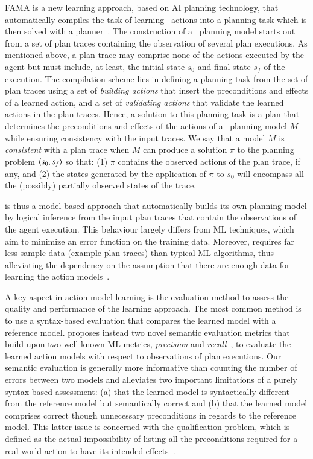 FAMA is a new learning approach, based on AI planning technology, that automatically compiles the task of learning \strips\ actions into a planning task which is then solved with a planner~\cite{aineto2018learning}. The construction of a \strips\ planning model starts out from a set of plan traces containing the observation of several plan executions. As mentioned above, a plan trace may comprise none of the actions executed by the agent but must include, at least, the initial state $s_0$ and final state $s_f$ of the execution. The compilation scheme lies in defining a planning task from the set of plan traces using a set of \emph{building actions} that insert the preconditions and effects of a learned action, and a set of \emph{validating actions} that validate the learned actions in the plan traces. Hence, a solution to this planning task is a plan that determines the preconditions and effects of the actions of a \strips\ planning model $M$ while ensuring consistency with the input traces. We say that a model $M$ is \emph{consistent} with a plan trace when $M$ can produce a solution $\pi$ to the planning problem ${\langle s_0,s_f \rangle}$ so that: (1) $\pi$ contains the observed actions of the plan trace, if any, and (2) the states generated by the application of $\pi$ to $s_0$ will encompass all the (possibly) partially observed states of the trace.

\FAMA is thus a model-based approach that automatically builds its own planning model by logical inference from the input plan traces that contain the observations of the agent execution. This behaviour largely differs from ML techniques, which aim to minimize an error function on the training data. Moreover, \FAMA requires far less sample data (example plan traces) than typical ML algorithms, thus alleviating the dependency on the assumption that there are enough data for learning the action models~\cite{Zhuo15}.

A key aspect in action-model learning is the evaluation method to assess the quality and performance of the learning approach. The most common method is to use a syntax-based evaluation that compares the learned model with a reference model. \FAMA proposes instead two novel semantic evaluation metrics that build upon two well-known ML metrics, {\em precision} and {\em recall}~\cite{davis2006relationship}, to evaluate the learned action models with respect to observations of plan executions. Our semantic evaluation is generally more informative than counting the number of errors between two models and alleviates two important limitations of a purely syntax-based assessment: (a) that the learned model is syntactically different from the reference model but semantically correct and (b) that the learned model comprises correct though unnecessary preconditions in regards to the reference model. This latter issue is concerned with the qualification problem, which is defined as the actual impossibility of listing all the preconditions required for a real world action to have its intended effects~\cite{GinsbergS88}.

